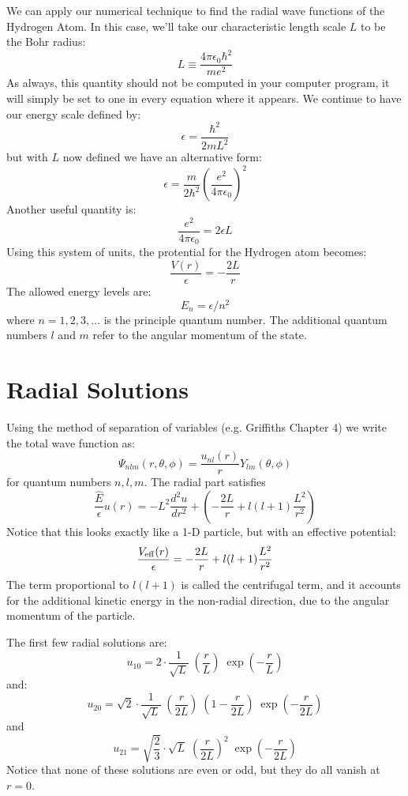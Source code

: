\documentclass[12pt]{article}
\begin{document}
We can apply our numerical technique to find the radial wave functions of
the Hydrogen Atom.  In this case, we'll take our characteristic length scale $L$ to be the Bohr radius:
$$L \equiv \frac{4 \pi \epsilon_0 \hbar^2}{m e^2}$$
As always, this quantity should not be computed in your computer program, it will simply be set to one in every equation where it appears.
We continue to have our energy scale defined by:
$$\epsilon = \frac{\hbar^2}{2mL^2}$$
but with $L$ now defined we have an alternative form:
$$\epsilon = \frac{m}{2\hbar^2} \left( \frac{e^2}{4\pi\epsilon_0}\right)^2$$
Another useful quantity is:
$$\frac{e^2}{4\pi\epsilon_0} = 2 \epsilon L$$
Using this system of units, the protential for the Hydrogen atom becomes:
$$\frac{V(r)}{\epsilon} = - \frac{2L}{r}$$
The allowed energy levels are:
$$E_n =  \epsilon / n^2$$
where $n=1,2,3,\ldots$ is the principle quantum number.  The additional quantum numbers $l$ and $m$ refer to the angular momentum of the state.

\section{Radial Solutions}

Using the method of separation of variables (e.g. Griffiths Chapter 4) we write the total wave function as:
$$\Psi_{nlm}(r,\theta,\phi) = \frac{u_{nl}(r)}{r} Y_{lm}(\theta,\phi)$$
for quantum numbers $n,l,m$.  The radial part satisfies 
\begin{equation*}
  \frac{\hat{E}}{\epsilon} u(r) = -L^2\frac{d^2 u}{dr^2} + \left(-\frac{2L}{r}+ l(l+1) \frac{L^2}{r^2}\right)
\end{equation*}
Notice that this looks exactly like a 1-D particle, but with an effective potential:
$$\frac{V_{\rm eff}(r)}{\epsilon} = -\frac{2L}{r}+ l(l+1) \frac{L^2}{r^2}$$
The term proportional to $l(l+1)$ is called the centrifugal term, and
it accounts for the additional kinetic energy in the non-radial
direction, due to the angular momentum of the particle.

The first few radial solutions are:
$$u_{10} = 2 \cdot \frac{1
}{\sqrt{L}} \; \left( \frac{r}{L} \right) \; \exp\left(-\frac{r}{L}\right)$$
and:
$$u_{20} = \sqrt{2} \cdot \frac{1}{\sqrt{L}} \; \left( \frac{r}{2L} \right) \; \left(1 - \frac{r}{2L} \right)\; \exp\left(-\frac{r}{2L}\right)$$
and
$$u_{21} = \sqrt{\frac{2}{3}} \cdot {\sqrt{L}} \; \left( \frac{r}{2L} \right)^2 \; \exp\left(-\frac{r}{2L}\right)$$
Notice that none of these solutions are even or odd, but they do all vanish at $r=0$.
\end{document}
